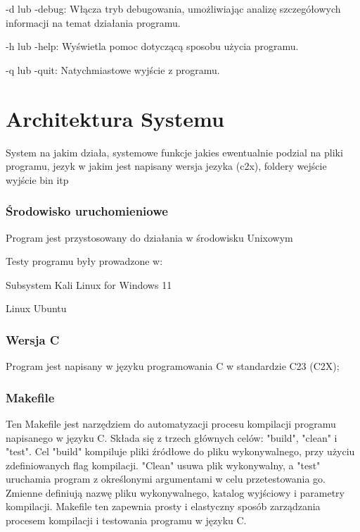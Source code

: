 \documentclass[
]{article}
\begin{document}
-d lub -debug: Włącza tryb debugowania, umożliwiając analizę
szczegółowych informacji na temat działania programu.

-h lub -help: Wyświetla pomoc dotyczącą sposobu użycia programu.

-q lub -quit: Natychmiastowe wyjście z programu.

\hypertarget{architektura-systemu}{%
\section{Architektura Systemu}\label{architektura-systemu}}

System na jakim działa, systemowe funkcje jakies ewentualnie podzial na
pliki programu, jezyk w jakim jest napisany wersja jezyka (c2x), foldery
wejście wyjście bin itp

\hypertarget{ux15brodowisko-uruchomieniowe}{%
\subsubsection{Środowisko
uruchomieniowe}\label{ux15brodowisko-uruchomieniowe}}

Program jest przystosowany do działania w środowisku Unixowym

Testy programu były prowadzone w:

Subsystem Kali Linux for Windows 11

Linux Ubuntu

\hypertarget{wersja-c}{%
\subsubsection{\texorpdfstring{Wersja C }{Wersja C }}\label{wersja-c}}

Program jest napisany w języku programowania C w standardzie C23 (C2X);

\hypertarget{makefile}{%
\subsubsection{Makefile}\label{makefile}}

Ten Makefile jest narzędziem do automatyzacji procesu kompilacji
programu napisanego w języku C. Składa się z trzech głównych celów:
"build", "clean" i "test". Cel "build" kompiluje pliki źródłowe do pliku
wykonywalnego, przy użyciu zdefiniowanych flag kompilacji. "Clean" usuwa
plik wykonywalny, a "test" uruchamia program z określonymi argumentami w
celu przetestowania go. Zmienne definiują nazwę pliku wykonywalnego,
katalog wyjściowy i parametry kompilacji. Makefile ten zapewnia prosty i
elastyczny sposób zarządzania procesem kompilacji i testowania programu
w języku C.
\end{document}
